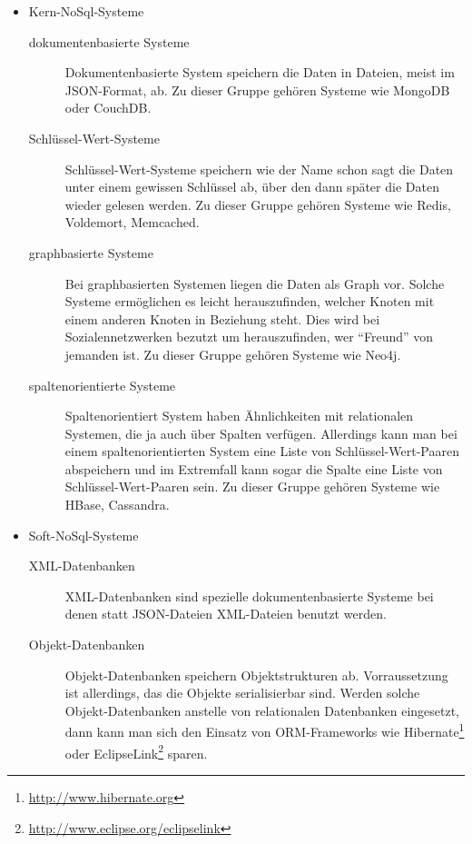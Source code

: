 \begin{itemize}
    \item Kern-NoSql-Systeme
        \begin{description}
            \item[dokumentenbasierte Systeme] Dokumentenbasierte System
                speichern die Daten in Dateien, meist im \gls{JSON}-Format, ab.
                Zu dieser Gruppe gehören Systeme wie MongoDB oder CouchDB.
            \item[Schlüssel-Wert-Systeme] Schlüssel-Wert-Systeme speichern wie
                der Name schon sagt die Daten unter einem gewissen Schlüssel ab,
                über den dann später die Daten wieder gelesen werden. Zu dieser
                Gruppe gehören Systeme wie Redis, Voldemort, Memcached.
            \item[graphbasierte Systeme] Bei graphbasierten Systemen liegen die
                Daten als Graph vor. Solche Systeme ermöglichen es leicht
                herauszufinden, welcher Knoten mit einem anderen Knoten in
                Beziehung steht. Dies wird bei Sozialennetzwerken bezutzt um
                herauszufinden, wer \enquote{Freund} von jemanden ist. Zu
                dieser Gruppe gehören Systeme wie Neo4j.
            \item[spaltenorientierte Systeme] Spaltenorientiert System haben
                Ähnlichkeiten mit relationalen Systemen, die ja auch über
                Spalten verfügen. Allerdings kann man bei einem
                spaltenorientierten System eine Liste von Schlüssel-Wert-Paaren
                abspeichern und im Extremfall kann sogar die Spalte eine Liste
                von Schlüssel-Wert-Paaren sein. Zu dieser Gruppe gehören Systeme
                wie HBase, Cassandra.
        \end{description}
    \item Soft-NoSql-Systeme
        \begin{description}
            \item[XML-Datenbanken] XML-Datenbanken sind spezielle
                dokumentenbasierte Systeme bei denen statt \gls{JSON}-Dateien
                \gls{XML}-Dateien benutzt werden.
            \item[Objekt-Datenbanken] Objekt-Datenbanken speichern
                Objektstrukturen ab. Vorraussetzung ist allerdings, das die
                Objekte serialisierbar sind. Werden solche Objekt-Datenbanken
                anstelle von relationalen Datenbanken eingesetzt, dann kann man
                sich den Einsatz von \gls{ORM}-Frameworks wie
                Hibernate\footnote{\url{http://www.hibernate.org}}
                oder EclipseLink\footnote{\url{http://www.eclipse.org/eclipselink}}
                sparen.
        \end{description}
\end{itemize}

